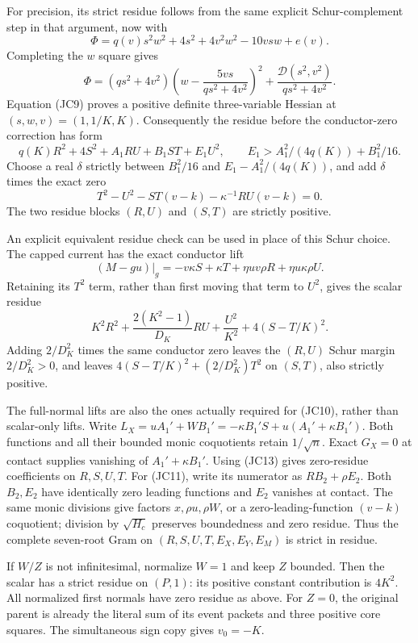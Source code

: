 For precision, its strict residue follows from the same explicit
Schur-complement step in that argument, now with
\[
 \Phi=q(v)s^2w^2+4s^2+4v^2w^2-10vsw+e(v).
\]
Completing the $w$ square gives
\[
 \Phi=(qs^2+4v^2)
       \left(w-\frac{5vs}{qs^2+4v^2}\right)^2
       +\frac{\mathcal D(s^2,v^2)}{qs^2+4v^2}.
\]
Equation (JC9) proves a positive definite three-variable Hessian
at $(s,w,v)=(1,1/K,K)$.  Consequently the residue before the
conductor-zero correction has form
\[
 q(K)R^2+4S^2+A_1RU+B_1ST+E_1U^2,
 \qquad E_1>A_1^2/(4q(K))+B_1^2/16.
\]
Choose a real $\delta$ strictly between $B_1^2/16$ and
$E_1-A_1^2/(4q(K))$, and add $\delta$ times the exact zero
\[
 T^2-U^2-ST(v-k)-\kappa^{-1}RU(v-k)=0.
\]
The two residue blocks $(R,U)$ and $(S,T)$ are strictly positive.

An explicit equivalent residue check can be used in place of this
Schur choice.  The capped current has the exact conductor lift
\[
 (M-gu)|_g=-v\kappa S+\kappa T
                  +\eta uv\rho R+\eta u\kappa\rho U.
\]
Retaining its $T^2$ term, rather than first moving that term to $U^2$,
gives the scalar residue
\[
 K^2R^2+\frac{2(K^2-1)}{D_K}RU+\frac{U^2}{K^2}
                  +4(S-T/K)^2.
\]
Adding $2/D_K^2$ times the same conductor zero leaves the $(R,U)$
Schur margin $2/D_K^2>0$, and leaves
$4(S-T/K)^2+(2/D_K^2)T^2$ on $(S,T)$, also strictly positive.

The full-normal lifts are also the ones actually required for
(JC10), rather than scalar-only lifts.  Write
$L_X=uA_1'+WB_1'=-\kappa B_1'S+u(A_1'+\kappa B_1')$.
Both functions and all their bounded monic coquotients retain
$1/\sqrt n$.  Exact $G_X=0$ at contact supplies vanishing of
$A_1'+\kappa B_1'$.  Using (JC13) gives zero-residue coefficients
on $R,S,U,T$.  For (JC11), write its numerator as $RB_2+\rho E_2$.
Both $B_2,E_2$ have identically zero leading functions and $E_2$
vanishes at contact.  The same monic divisions give factors
$x,\rho u,\rho W$, or a zero-leading-function $(v-k)$ coquotient;
division by $\sqrt{H_c}$ preserves boundedness and zero residue.
Thus the complete seven-root Gram on
$(R,S,U,T,E_X,E_Y,E_M)$ is strict in residue.

If $W/Z$ is not infinitesimal, normalize $W=1$ and keep $Z$
bounded.  Then the scalar has a strict residue on $(P,1)$:
its positive constant contribution is $4K^2$.  All normalized
first normals have zero residue as above.  For $Z=0$, the original
parent is already the literal sum of its event packets and three
positive core squares.  The simultaneous sign copy gives $v_0=-K$.

